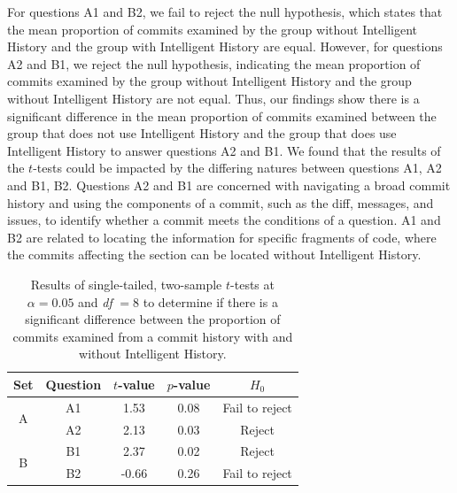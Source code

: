 For questions A1 and B2, we fail to reject the null hypothesis, which states that the mean proportion of commits examined 
by the group without Intelligent History and the group with Intelligent History are equal.
However, for questions A2 and B1, we reject the null hypothesis, indicating the mean proportion of commits examined 
by the group without Intelligent History and the group without Intelligent History are not equal.
Thus, our findings show there is a significant difference in the mean proportion of commits examined between 
the group that does not use Intelligent History and the group that does use Intelligent History to answer questions A2 and B1.
We found that the results of the $t$-tests could be impacted by the differing natures between questions A1, A2 and B1, B2.
Questions A2 and B1 are concerned with navigating a broad commit history and using the components of a commit, such
as the diff, messages, and issues, to identify whether a commit meets the conditions of a question.
A1 and B2 are related to locating the information for specific fragments of code,
where the commits affecting the section can be located without Intelligent History. 

\begin{table}[h]
  \caption{
    Results of single-tailed, two-sample $t$-tests at $\alpha = 0.05$ and \emph{df} $= 8$ to determine if there is a significant difference between the proportion of commits examined from a commit history
    with and without Intelligent History.
  }
  \centering
  \begin{tabular}{@{}ccccc@{}}
    \toprule
    Set                                     & Question               & \multicolumn{1}{c}{$t$-value} & \multicolumn{1}{c}{$p$-value} & $H_{0}$ \\ \midrule
    \multicolumn{1}{c|}{\multirow{2}{*}{A}} & \multicolumn{1}{c|}{A1} & 1.53                        & 0.08                        & Fail to reject   \\ \cmidrule(l){2-5} 
    \multicolumn{1}{c|}{}                   & \multicolumn{1}{c|}{A2} & 2.13                        & 0.03                        & Reject   \\ \midrule
    \multicolumn{1}{c|}{\multirow{2}{*}{B}} & \multicolumn{1}{c|}{B1} & 2.37                        & 0.02                        & Reject   \\ \cmidrule(l){2-5} 
    \multicolumn{1}{c|}{}                   & \multicolumn{1}{c|}{B2} & -0.66                       & 0.26                        & Fail to reject   \\ \bottomrule
  \end{tabular}
  \label{tab:t-test}
\end{table}

